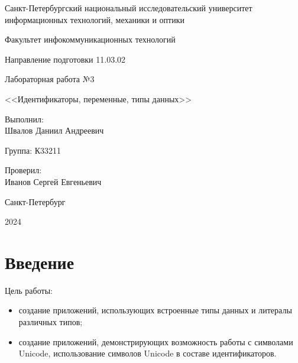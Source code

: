 \documentclass[a4paper, 14pt]{extarticle}
\begin{document}
\begin{titlepage}
  \vspace{0pt plus2fill}
  \noindent

  \vspace{0pt plus6fill}
  \begin{center}
    Санкт-Петербургский национальный исследовательский университет
    информационных технологий, механики и оптики

    \vspace{0pt plus3fill}

    Факультет инфокоммуникационных технологий

    Направление подготовки 11.03.02

    \vspace{0pt plus2fill}

    Лабораторная работа №3

    <<Идентификаторы, переменные, типы данных>>

  \end{center}

  \vspace{0pt plus6fill}
  \begin{flushright}
    Выполнил: \\
    Швалов Даниил Андреевич

    Группа: К33211

    Проверил: \\
    Иванов Сергей Евгеньевич
  \end{flushright}

  \vspace{0pt plus5fill}
  \begin{center}
    Санкт-Петербург

    2024
  \end{center}
\end{titlepage}

\setcounter{page}{2}

\section*{Введение}

Цель работы:
\begin{itemize}
  \item создание приложений, использующих встроенные типы данных и литералы
  различных типов;
  \item создание приложений, демонстрирующих возможность работы с символами
  Unicode, использование символов Unicode в составе идентификаторов.
\end{itemize}
\end{document}
